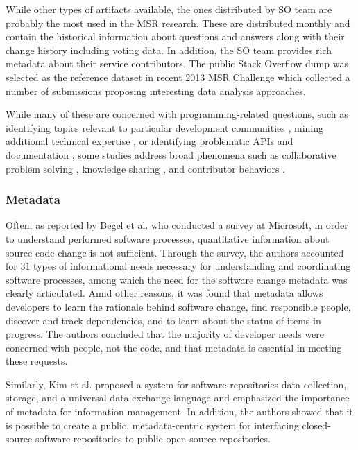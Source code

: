 While other types of artifacts available, the ones distributed by SO team are probably the most used in the MSR research. 
These are distributed monthly and contain the historical information about questions and answers along with their change 
history including voting data. In addition, the SO team provides rich metadata about their service contributors. 
The public Stack Overflow dump was selected as the reference dataset in recent 2013 MSR Challenge \cite{MSRChallenge2013} 
which collected a number of submissions proposing interesting data analysis approaches.

While many of these are concerned with programming-related questions, such as identifying topics relevant to particular 
development communities \cite{kartik:msr14}, mining additional technical expertise \cite{VenkataramaniGAMB13} \cite{SaxeMG13}, 
or identifying problematic APIs \cite{KavalerPGCDF13} \cite{Linares2013Exploratory} and documentation \cite{Campbell2013Deficient},
some studies address broad phenomena such as collaborative problem solving \cite{Tausczik2014Collaborative},
knowledge sharing \cite{VasilescuCSCW14} \cite{Schenk2013Geo}, and contributor behaviors \cite{Bosu2013Building} \cite{GinscaP13}.

\subsubsection{Metadata}
Often, as reported by Begel et al. \cite{citeulike:7260421} who conducted a survey at Microsoft, in order to understand 
performed software processes, quantitative information about source code change is not sufficient. 
Through the survey, the authors accounted for 31 types of informational needs necessary for understanding and 
coordinating software processes, among which the need for the software change metadata was clearly articulated. 
Amid other reasons, it was found that metadata allows developers to learn the rationale behind software change,
find responsible people, discover and track dependencies, and to learn about the status of items in progress. 
The authors concluded that the majority of developer needs were concerned with people, not the code, and that 
metadata is essential in meeting these requests.

Similarly, Kim et al. \cite{citeulike:4000311} proposed a system for software repositories data collection, storage, 
and a universal data-exchange language and emphasized the importance of metadata for information management.
In addition, the authors showed that it is possible to create a public, metadata-centric system for interfacing 
closed-source software repositories to public open-source repositories.


